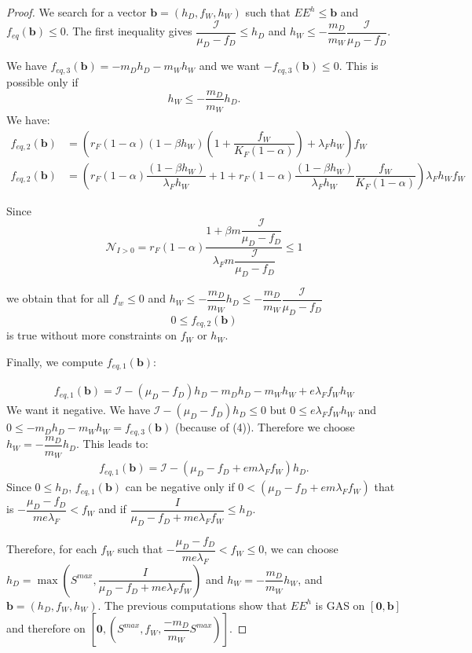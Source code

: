 \documentclass{article}
\newcommand{\lfw}{\lambda_{F}}
\newcommand{\lfw}{\lambda_{F}}
\newcommand{\cI}{\mathcal{I}}
\newcommand{\vb}{\mathbf{b}}
\theoremstyle{definition}
\theoremstyle{remark}
\begin{document}
\begin{proof}
We search for a vector $\vb=(h_D, f_W, h_W)$ such that $EE^{h} \leq \vb$ and $f_{eq}(\vb) \leq 0$. The first inequality gives $\dfrac{\cI}{\mu_D - f_D} \leq h_D$ and $h_W \leq - \dfrac{m_D}{m_W}\dfrac{\cI}{\mu_D - f_D}$.

We have $f_{eq,3}(\vb) =-m_D h_D - m_W h_W$ and we want $-f_{eq,3}(\mathbf{b}) \leq 0$. This is possible only if 
\begin{equation}
h_W \leq -\dfrac{m_D}{m_W}h_D.
\end{equation}
We have:
\begin{align*}
f_{eq, 2}(\vb) &= \left(r_F(1-\alpha) (1-\beta h_W) \left(1 + \dfrac{f_W}{K_F(1-\alpha)}\right) + \lfw h_W \right) f_W \\
f_{eq, 2}(\vb) &= \left(r_F(1-\alpha) \dfrac{(1-\beta h_W)}{\lfw h_W} + 1  + r_F(1-\alpha) \dfrac{(1-\beta h_W)}{\lfw h_W} \dfrac{f_W}{K_F(1-\alpha)} \right) \lfw h_W f_W
\end{align*}

Since $$\mathcal{N}_{I>0} = r_F(1-\alpha) \dfrac{1 + \beta m \dfrac{\cI}{\mu_D - f_D}}{\lfw m \dfrac{\cI}{\mu_D - f_D}} \leq 1$$

we obtain that for all $f_w \leq 0$ and $h_W \leq -\dfrac{m_D}{m_W}h_D \leq -\dfrac{m_D}{m_W} \dfrac{\cI}{\mu_D - f_D}$
$$
0 \leq f_{eq, 2}(\vb)
$$
is true without more constraints on $f_W$ or $h_W$.

Finally, we compute $f_{eq, 1}(\vb)$:

\begin{align*}
f_{eq, 1}(\vb) = \cI - (\mu_D - f_D)h_D -m_Dh_D - m_W h_W + e \lfw f_W h_W
\end{align*}
We want it negative. We have $\cI - (\mu_D - f_D) h_D \leq 0$ but $0 \leq e \lfw f_W h_W$ and $0 \leq -m_Dh_D - m_W h_W = f_{eq, 3}(\vb)$ (because of (4)). Therefore we choose $h_W = - \dfrac{m_D}{m_W}h_D$. This leads to:
\begin{align*}
f_{eq, 1}(\vb) = \cI - (\mu_D - f_D + em \lfw f_W)h_D.
\end{align*}
Since $0 \leq h_D$, $f_{eq, 1}(\vb)$ can be negative only if $0 < (\mu_D - f_D + em \lfw f_W)$ that is $- \dfrac{\mu_D - f_D}{me \lfw} < f_W$ and if $\dfrac{I}{\mu_D - f_D + me \lfw f_W} \leq h_D.$

Therefore, for each $f_W$ such that $- \dfrac{\mu_D - f_D}{me \lfw} < f_W \leq 0$, we can choose $h_D = \max(S^{max}, 
\dfrac{I}{\mu_D - f_D + me \lfw f_W})$ and $h_W = -\dfrac{m_D}{m_W}h_W$, and $\vb = (h_D, f_W, h_W)$. The previous computations show that $EE^{h}$ is GAS on $[\mathbf{0}, \vb]$ and therefore on $[\mathbf{0}, (S^{max}, f_W, \dfrac{-m_D}{m_W}S^{max})]$.
\end{proof}
\end{document}
